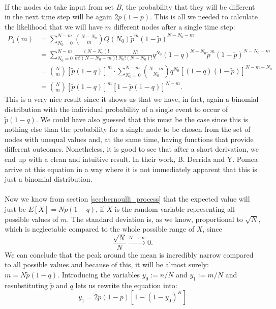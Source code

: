 \paragraph*{}
If the nodes do take input from set $B$, the probability that they will be different in the next time step will be again $2p(1-p)$. This is all we needed to calculate the likelihood that we will have $m$ different nodes after a single time step:
\begin{equation}
\begin{split}
P_1(m) &= \sum\limits_{N_0 = 0}^{N-m} {N-N_0 \choose m} Q(N_0) \tilde{p}^m (1-\tilde{p})^{N-N_0-m} \\
&= \sum\limits_{N_0 = 0}^{N-m} \frac{(N-N_0)!}{m!(N-N_0-m)!}\frac{N!}{N_0 !(N-N_0)!} q^{N_0}  (1-q)^{N-N_0} \tilde{p}^m (1-\tilde{p})^{N-N_0-m}\\
&= {N \choose m} \left[\tilde{p}(1-q)\right]^m \cdot\sum\limits_{N_0 = 0}^{N-m} {N-m \choose N_0} q^{N_0}  \left[(1-q) (1-\tilde{p})\right]^{N-m-N_0}\\
&= {N \choose m} \left[\tilde{p}(1-q)\right]^m \left[1-\tilde{p}(1-q)\right]^{N-m}.
\end{split}
\end{equation}
This is a very nice result since it shows us that we have, in fact, again a binomial distribution with the individual probability of a single event to occur of $\tilde{p}(1-q)$. We could have also guessed that this must be the case since this is nothing else than the probability for a single node to be chosen from the set of nodes with unequal values and, at the same time, having functions that provide different outcomes. Nonetheless, it is good to see that after a short derivation, we end up with a clean and intuitive result. In their work, B. Derrida and Y. Pomea arrive at this equation in a way where it is not immediately apparent that this is just a binomial distribution.

\paragraph*{}
Now we know from section \ref{sec:bernoulli_process} that the expected value will just be $E[X] = N\tilde{p}(1-q)$, if $X$ is the random variable representing all possible values of $m$. The standard deviation is, as we know, proportional to $ \sqrt{N} $, which is neglectable compared to the whole possible range of $ X $, since
\begin{equation}
\frac{\sqrt{N}}{N} \stackrel{N\rightarrow\infty}{\longrightarrow}0.
\end{equation}
We can conclude that the peak around the mean is incredibly narrow compared to all possible values and because of this, it will be almost surely: $m = N\tilde{p}(1-q)$. Introducing the variables $y_0:=n/N$ and $y_1:=m/N$ and resubstituting $\tilde{p}$ and $q$ lets us rewrite the equation into:
\begin{equation}\label{eq:first_map}
y_1 = 2p(1-p)[1-(1-y_0)^K]
\end{equation}

